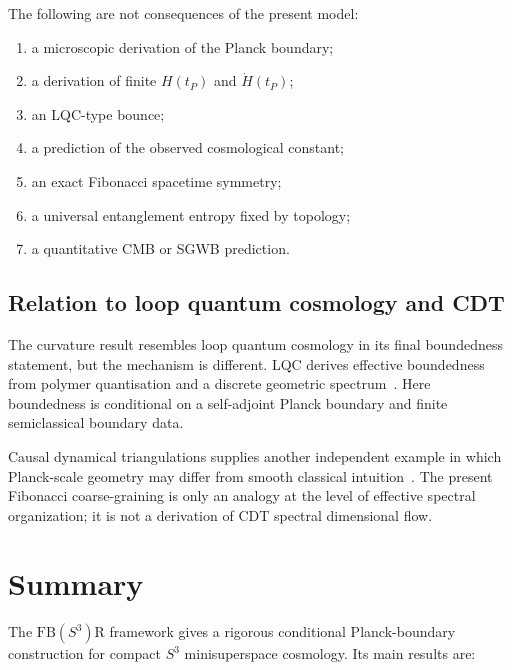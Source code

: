 \documentclass[reprint,aps,prd,letterpaper,superscriptaddress,nofootinbib,longbibliography,floatfix]{revtex4-2}
\theoremstyle{remark}
\newcommand{\model}{\texorpdfstring{\(\mathrm{FB}(S^3)\mathrm{R}\)}{FB(S3)R}}
\begin{document}
The following are not consequences of the present model:
\begin{enumerate}
\item a microscopic derivation of the Planck boundary;
\item a derivation of finite \(H(t_P)\) and \(\dot H(t_P)\);
\item an LQC-type bounce;
\item a prediction of the observed cosmological constant;
\item an exact Fibonacci spacetime symmetry;
\item a universal entanglement entropy fixed by topology;
\item a quantitative CMB or SGWB prediction.
\end{enumerate}

\subsection{Relation to loop quantum cosmology and CDT}

The curvature result resembles loop quantum cosmology in its final boundedness
statement, but the mechanism is different.  LQC derives effective boundedness
from polymer quantisation and a discrete geometric spectrum~\cite{Ashtekar}.
Here boundedness is conditional on a self-adjoint Planck boundary and finite
semiclassical boundary data.

Causal dynamical triangulations supplies another independent example in which
Planck-scale geometry may differ from smooth classical intuition~\cite{CDT}.
The present Fibonacci coarse-graining is only an analogy at the level of
effective spectral organization; it is not a derivation of CDT spectral
dimensional flow.

\section{Summary}

The \model{} framework gives a rigorous conditional Planck-boundary construction
for compact \(S^3\) minisuperspace cosmology.  Its main results are:
\end{document}
